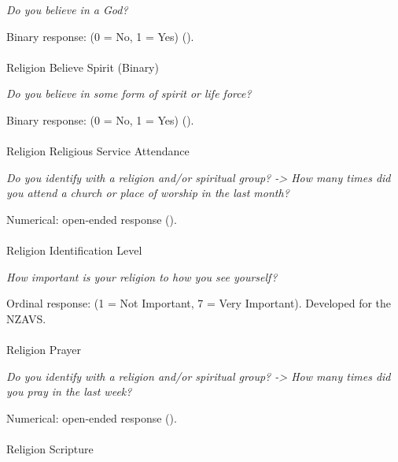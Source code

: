 \documentclass[
  single column]{article}
\makeatletter
\let\oldparagraph\paragraph
\renewcommand{\paragraph}{
    \@ifstar
      \xxxParagraphStar
      \xxxParagraphNoStar
  }
\newcommand{\xxxParagraphStar}[1]{\oldparagraph*{#1}\mbox{}}
\newcommand{\xxxParagraphNoStar}[1]{\oldparagraph{#1}\mbox{}}
\makeatother
\begin{document}
\emph{Do you believe in a God?}

Binary response: (0 = No, 1 = Yes)
().

\paragraph{Religion Believe Spirit
(Binary)}\label{religion-believe-spirit-binary}

\emph{Do you believe in some form of spirit or life force?}

Binary response: (0 = No, 1 = Yes)
().

\paragraph{Religion Religious Service
Attendance}\label{religion-religious-service-attendance}

\emph{Do you identify with a religion and/or spiritual group?
-\textgreater{} How many times did you attend a church or place of
worship in the last month?}

Numerical: open-ended response ().

\paragraph{Religion Identification
Level}\label{religion-identification-level}

\emph{How important is your religion to how you see yourself?}

Ordinal response: (1 = Not Important, 7 = Very Important). Developed for
the NZAVS.

\paragraph{Religion Prayer}\label{religion-prayer}

\emph{Do you identify with a religion and/or spiritual group?
-\textgreater{} How many times did you pray in the last week?}

Numerical: open-ended response ().

\paragraph{Religion Scripture}\label{religion-scripture}
\end{document}
